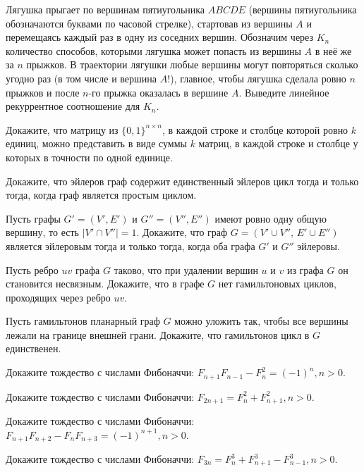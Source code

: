 Лягушка прыгает по вершинам пятиугольника $ABCDE$ (вершины пятиугольника обозначаются буквами по часовой стрелке), стартовав из вершины $A$ и перемещаясь каждый раз в одну из соседних вершин. Обозначим через $K_n$ количество способов, которыми лягушка может попасть из вершины $A$ в неё же за $n$ прыжков. В траектории лягушки любые вершины могут повторяться сколько угодно раз (в том числе и вершина $A$!), главное, чтобы лягушка сделала ровно $n$ прыжков и после $n$-го прыжка оказалась в вершине $A$. Выведите линейное рекуррентное соотношение для $K_n$.

Докажите, что матрицу из $\{0,1\}^{n\times n}$, в каждой строке и столбце которой ровно $k$ единиц, можно представить в виде суммы $k$ матриц, в каждой строке и столбце у которых в точности по одной единице.

Докажите, что эйлеров граф содержит единственный эйлеров цикл тогда и только тогда, когда граф является простым циклом.

Пусть графы $G'=(V',E')$ и $G''=(V'',E'')$ имеют ровно одну общую вершину, то есть $|V'\cap V''|=1$. Докажите, что граф $G=(V'\cup V'',\,E'\cup E'')$ является эйлеровым тогда и только тогда, когда оба графа $G'$ и $G''$ эйлеровы.

Пусть ребро $uv$ графа $G$ таково, что при удалении вершин $u$ и $v$ из графа $G$ он становится несвязным. Докажите, что в графе $G$ нет гамильтоновых циклов, проходящих через ребро $uv$.

Пусть гамильтонов планарный граф $G$ можно уложить так, чтобы все вершины лежали на границе внешней грани. Докажите, что гамильтонов цикл в $G$ единственен.

Докажите тождество с числами Фибоначчи: $F_{n+1}F_{n-1}-F_n^2=(-1)^n, n>0$.

Докажите тождество с числами Фибоначчи: $F_{2n+1}=F_n^2+F_{n+1}^2, n>0$.

Докажите тождество с числами Фибоначчи: $F_{n+1}F_{n+2}-F_nF_{n+3}=(-1)^{n+1}, n>0$.

Докажите тождество с числами Фибоначчи: $F_{3n}=F_n^3+F_{n+1}^3-F_{n-1}^3, n>0$.

